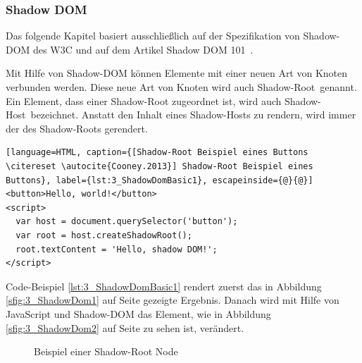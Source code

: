 \subsubsection{Shadow DOM}
\label{sec:3_WC_Shadow_DOM}

Das folgende Kapitel basiert ausschließlich auf der Spezifikation von Shadow-DOM des W3C \citereset \autocite[siehe][]{GlazkovShadowDOM.2013} und auf dem Artikel \glqq Shadow DOM 101\grqq\ \citereset \autocite[siehe][]{Cooney.2013}.

Mit Hilfe von Shadow-DOM können Elemente mit einer neuen Art von Knoten verbunden werden. Diese neue Art von Knoten wird auch \glqq Shadow-Root\grqq\ genannt. Ein Element, dass einer Shadow-Root zugeordnet ist, wird auch \glqq Shadow-Host\grqq\ bezeichnet. Anstatt den Inhalt eines Shadow-Hosts zu rendern, wird immer der des Shadow-Roots gerendert.

\begin{lstlisting}[language=HTML, caption={[Shadow-Root Beispiel eines Buttons \citereset \autocite{Cooney.2013}] Shadow-Root Beispiel eines Buttons}, label={lst:3_ShadowDomBasic1}, escapeinside={@}{@}]
<button>Hello, world!</button>
<script>
  var host = document.querySelector('button');
  var root = host.createShadowRoot();
  root.textContent = 'Hello, shadow DOM!';
</script>
\end{lstlisting}

Code-Beispiel \ref{lst:3_ShadowDomBasic1} rendert zuerst das in Abbildung \ref{sfig:3_ShadowDom1} auf Seite \pageref{sfig:3_ShadowDom1} gezeigte Ergebnis. Danach wird mit Hilfe von JavaScript und Shadow-DOM das Element, wie in Abbildung \ref{sfig:3_ShadowDom2} auf Seite \pageref{sfig:3_ShadowDom2} zu sehen ist, verändert.

\begin{figure}[h]
  \centering
  \qquad
  \caption[
    Beispiel einer Shadow-Root Node
  ]{
    Beispiel einer Shadow-Root Node
  }
  \label{sfig:3_ShadowDom}
\end{figure}


